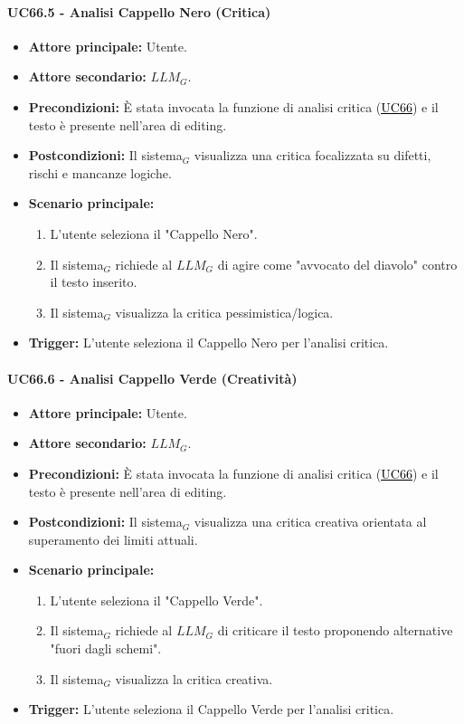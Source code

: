 \documentclass[a4paper, 10pt]{article}
\newcommand{\uclink}[2]{\hyperlink{#1}{\textcolor{black}{\underline{#2}}}}
\begin{document}
\hypertarget{uc:66.5}{}
\paragraph{UC66.5 - Analisi Cappello Nero (Critica)}
\begin{itemize}
    \item \textbf{Attore principale:} Utente.
    \item \textbf{Attore secondario:} $LLM_G$.
    \item \textbf{Precondizioni:} È stata invocata la funzione di analisi critica (\uclink{uc:66}{UC66}) e il testo è presente nell'area di editing.
    \item \textbf{Postcondizioni:} Il sistema$_G$ visualizza una critica focalizzata su difetti, rischi e mancanze logiche.
    \item \textbf{Scenario principale:}
    \begin{enumerate}
        \item L'utente seleziona il "Cappello Nero".
        \item Il sistema$_G$ richiede al $LLM_G$ di agire come "avvocato del diavolo" contro il testo inserito.
        \item Il sistema$_G$ visualizza la critica pessimistica/logica.
    \end{enumerate}
    \item \textbf{Trigger:} L'utente seleziona il Cappello Nero per l'analisi critica.
\end{itemize}

\hypertarget{uc:66.6}{}
\paragraph{UC66.6 - Analisi Cappello Verde (Creatività)}
\begin{itemize}
    \item \textbf{Attore principale:} Utente.
    \item \textbf{Attore secondario:} $LLM_G$.
    \item \textbf{Precondizioni:} È stata invocata la funzione di analisi critica (\uclink{uc:66}{UC66}) e il testo è presente nell'area di editing.
    \item \textbf{Postcondizioni:} Il sistema$_G$ visualizza una critica creativa orientata al superamento dei limiti attuali.
    \item \textbf{Scenario principale:}
    \begin{enumerate}
        \item L'utente seleziona il "Cappello Verde".
        \item Il sistema$_G$ richiede al $LLM_G$ di criticare il testo proponendo alternative "fuori dagli schemi".
        \item Il sistema$_G$ visualizza la critica creativa.
    \end{enumerate}
    \item \textbf{Trigger:} L'utente seleziona il Cappello Verde per l'analisi critica.

\end{itemize}
\end{document}
